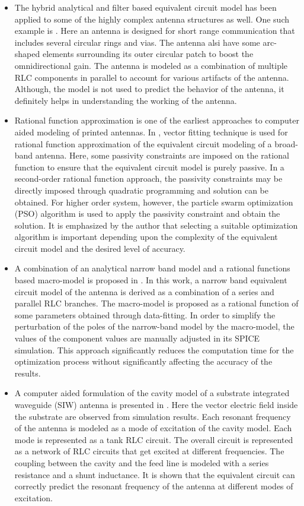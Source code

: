 \begin{itemize}
\item The hybrid analytical and filter based equivalent circuit model has been applied to some of the highly complex antenna structures as well. One such example is \cite{ana_eqckt_ex1}. Here an antenna is designed for short range communication that includes several circular rings and vias. The antenna alsi have some arc-shaped elements surrounding its outer circular patch to boost the omnidirectional gain. The antenna is modeled as a combination of multiple RLC components in parallel to account for various artifacts of the antenna. Although, the model is not used to predict the behavior of the antenna, it definitely helps in understanding the working of the antenna.
\item Rational function approximation is one of the earliest approaches to computer aided modeling of printed antennas. In \cite{comp-aided-eqckt}, vector fitting technique is used for rational function approximation of the equivalent circuit modeling of a broad-band antenna. Here, some passivity constraints are imposed on the rational function to ensure that the equivalent circuit model is purely passive. In a second-order rational function approach, the passivity constraints may be directly imposed through quadratic programming and solution can be obtained. For higher order system, however, the particle swarm optimization (PSO) algorithm is used to apply the passivity constraint and obtain the solution. It is emphasized by the author that selecting a suitable optimization algorithm is important depending upon the complexity of the equivalent circuit model and the desired level of accuracy.
\item A combination of an analytical narrow band model and a rational functions based macro-model is proposed in \cite{UwbPmaEqCkt1}. In this work, a narrow band equivalent circuit model of the antenna is derived as a combination of a series and parallel RLC branches. The macro-model is proposed as a rational function of some parameters obtained through data-fitting. In order to simplify the perturbation of the poles of the narrow-band model by the macro-model, the values of the component values are manually adjusted in its SPICE simulation. This approach significantly reduces the computation time for the optimization process without significantly affecting the accuracy of the results.
\item A computer aided formulation of the cavity model of a substrate integrated waveguide (SIW) antenna is presented in \cite{comp-aided-eqckt2}. Here the vector electric field inside the substrate are observed from simulation results. Each resonant frequency of the antenna is modeled as a mode of excitation of the cavity model. Each mode is represented as a tank RLC circuit. The overall circuit is represented as a network of RLC circuits that get excited at different frequencies. The coupling between the cavity and the feed line is modeled with a series resistance and a shunt inductance. It is shown that the equivalent circuit can correctly predict the resonant frequency of the antenna at different modes of excitation.

\end{itemize}
